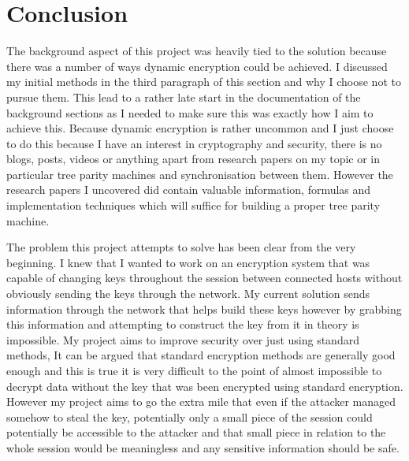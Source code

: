 \section{Conclusion}
The background aspect of this project was heavily tied to the solution because there was a number of ways dynamic encryption could be achieved. I discussed my initial methods in the third paragraph of this section and why I choose not to pursue them. This lead to a rather late start in the documentation of the background sections as I needed to make sure this was exactly how I aim to achieve this. Because dynamic encryption is rather uncommon and I just choose to do this because I have an interest in cryptography and security, there is no blogs, posts, videos or anything apart from research papers on my topic or in particular tree parity machines and synchronisation between them. However the research papers I uncovered did contain valuable information, formulas and implementation techniques which will suffice for building a proper tree parity machine. 


The problem this project attempts to solve has been clear from the very beginning. I knew that I wanted to work on an encryption system that was capable of changing keys throughout the session between connected hosts without obviously sending the keys through the network. My current solution sends information through the network that helps build these keys however by grabbing this information and attempting to construct the key from it in theory is impossible. My project aims to improve security over just using standard methods, It can be argued that standard encryption methods are generally good enough and this is true it is very difficult to the point of almost impossible to decrypt data without the key that was been encrypted using standard encryption. However my project aims to go the extra mile that even if the attacker managed somehow to steal the key, potentially only a small piece of the session could potentially be accessible to the attacker and that small piece in relation to the whole session would be meaningless and any sensitive information should be safe.


